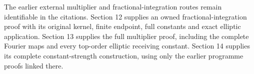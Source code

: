\documentclass[
  11pt,
]{article}
\begin{document}
The earlier external multiplier and fractional-integration routes remain
identifiable in the citations. Section 12 supplies an owned
fractional-integration proof with its original kernel, finite endpoint,
full constants and exact elliptic application. Section 13 supplies the
full multiplier proof, including the complete Fourier maps and every
top-order elliptic receiving constant. Section 14 supplies its complete
constant-strength construction, using only the earlier programme proofs
linked there.
\end{document}
